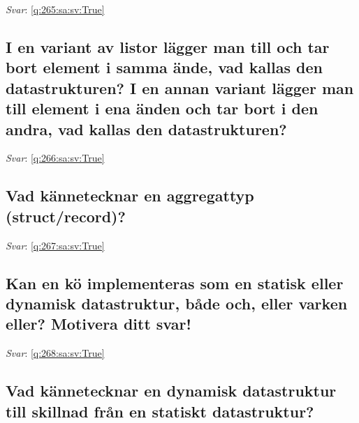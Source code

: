 \documentclass[a4paper,11pt,oneside]{article}
\begin{document}
\begin{sloppypar}
\textit{Svar}: \autoref{q:265:sa:sv:True}



\subsection{I en variant av listor l\"agger man till och tar bort element i samma \"ande, vad kallas den datastrukturen? I en annan variant l\"agger man till element i ena \"anden och tar bort i den andra, vad kallas den datastrukturen?}

\label{q:266:sa:sv:False}

\vspace{2cm}

\noindent\makebox[\textwidth]{\hrulefill}

\vspace{1cm}

\textit{Svar}: \autoref{q:266:sa:sv:True}



\subsection{Vad k\"annetecknar en aggregattyp (struct/record)?}

\label{q:267:sa:sv:False}

\vspace{2cm}

\noindent\makebox[\textwidth]{\hrulefill}

\vspace{1cm}

\textit{Svar}: \autoref{q:267:sa:sv:True}



\subsection{Kan en k\"o implementeras som en statisk eller dynamisk datastruktur, b\r{a}de och, eller varken eller? Motivera ditt svar!}

\label{q:268:sa:sv:False}

\vspace{2cm}

\noindent\makebox[\textwidth]{\hrulefill}

\vspace{1cm}

\textit{Svar}: \autoref{q:268:sa:sv:True}



\subsection{Vad k\"annetecknar en dynamisk datastruktur till skillnad fr\r{a}n en statiskt datastruktur?}


\end{sloppypar}
\end{document}
